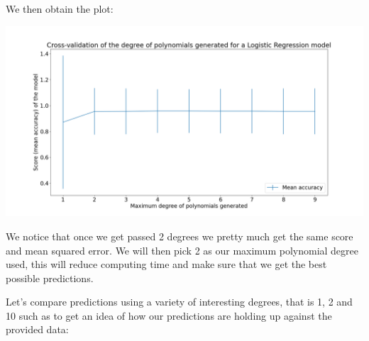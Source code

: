 \documentclass[10pt]{article}
\begin{document}
We then obtain the plot:
\begin{center}
    \includegraphics[scale=0.25]{ds_1_degree_cv.png}
\end{center}
\vspace{5mm} %

We notice that once we get passed 2 degrees we pretty much get the same
score and mean squared error. We will then pick 2 as our maximum polynomial degree used,
this will reduce computing time and make sure that we get the best possible
predictions.

Let's compare predictions using a variety of interesting degrees, that is 1, 2 and 10
such as to get an idea of how our predictions are holding up against the provided data:
\end{document}
